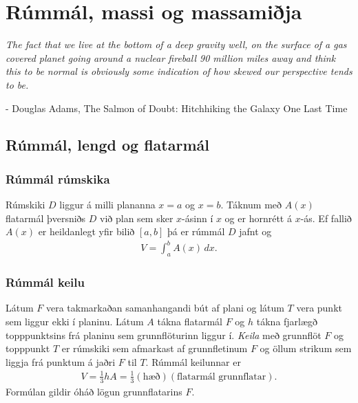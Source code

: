 \documentclass[a4paper,10pt,icelandic]{sphinxmanual}
\begin{document}
\chapter{Rúmmál, massi og massamiðja}
\label{kafli07:rummal-massi-og-massamija}\label{kafli07::doc}
\emph{The fact that we live at the bottom of a deep gravity well, on the surface of a
gas covered planet going around a nuclear fireball 90 million miles away and think
this to be normal is obviously some indication of how skewed our perspective tends to be.}

- Douglas Adams, The Salmon of Doubt: Hitchhiking the Galaxy One Last Time


\section{Rúmmál, lengd og flatarmál}
\label{kafli07:rummal-lengd-og-flatarmal}\label{kafli07:index-1}

\subsection{Rúmmál rúmskika}
\label{kafli07:rummal-rumskika}
Rúmskiki \(D\) liggur á milli plananna \(x=a\) og \(x=b\).
Táknum með \(A(x)\) flatarmál þversniðs \(D\) við plan sem sker
\(x\)-ásinn í \(x\) og er hornrétt á \(x\)-ás. Ef fallið
\(A(x)\) er heildanlegt yfir bilið \([a, b]\) þá er rúmmál
\(D\) jafnt og
\begin{equation*}
\begin{split}V=\int_a^b A(x)\,dx.\end{split}
\end{equation*}

\subsection{Rúmmál keilu}
\label{kafli07:rummal-keilu}\label{kafli07:index-2}
Látum \(F\) vera takmarkaðan samanhangandi bút af plani og látum
\(T\) vera punkt sem liggur ekki í planinu. Látum \(A\) tákna
flatarmál \(F\) og \(h\) tákna fjarlægð topppunktsins frá
planinu sem grunnflöturinn liggur í. \textit{Keila} með grunnflöt \(F\) og
topppunkt \(T\) er rúmskiki sem afmarkast af grunnfletinum \(F\)
og öllum strikum sem liggja frá punktum á jaðri \(F\) til \(T\).
Rúmmál keilunnar er
\begin{equation*}
\begin{split}V=\frac{1}{3}hA=\frac{1}{3}(\mbox{hæð})(\mbox{flatarmál
grunnflatar}).\end{split}
\end{equation*}
Formúlan gildir óháð lögun grunnflatarins \(F\).
\end{document}
